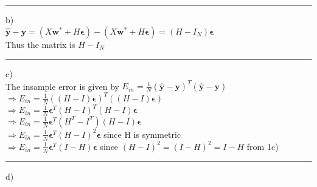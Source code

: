 \documentclass{article}
\begin{document}
\par\noindent\rule{\textwidth}{0.4pt}

b) \\ 

$\bm{\hat{y}} - \bm{y} = (X\bm{w^*} + H\bm{\epsilon}) - (X\bm{w^*} + H\bm{\epsilon}) = (H-I_N)\bm{\epsilon}$ 
\\
Thus the matrix is $H-I_N$

\par\noindent\rule{\textwidth}{0.4pt}

c) \\

The insample error is given by $E_{in} = \frac{1}{N}(\bm{\hat{y}}-\bm{y})^T(\bm{\hat{y}}-\bm{y})$ \\ 

$\Rightarrow E_{in} = \frac{1}{N}((H-I)\bm{\epsilon})^T((H-I)\bm{\epsilon})$ \\ 
$ \Rightarrow E_{in} = \frac{1}{N} \bm{\epsilon}^T(H-I)^T(H-I)\bm{\epsilon} $ \\ 
$\Rightarrow E_{in} =  \frac{1}{N} \bm{\epsilon}^T(H^T-I^T)(H-I)\bm{\epsilon}$ \\ 
$ \Rightarrow E_{in} = \frac{1}{N} \bm{\epsilon}^T(H-I)^2\bm{\epsilon} $ since H is symmetric \\ 
$ \Rightarrow E_{in} = \frac{1}{N} \bm{\epsilon}^T(I-H)\bm{\epsilon}$ since $(H-I)^2 = (I-H)^2 = I-H $ from 1c) 

\par\noindent\rule{\textwidth}{0.4pt}

d) \\ 
\end{document}
